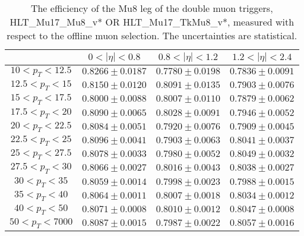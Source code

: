 \begin{table}[!ht]
\begin{center}
\begin{tabular}{c|c|c|c}
\hline & $0 < |\eta| < 0.8$ & $0.8 < |\eta| < 1.2$ & $1.2 < |\eta| < 2.4$  \\
\hline
$ 10 < p_T < 12.5$ & $0.8266 \pm 0.0187$ & $0.7780 \pm 0.0198$ & $0.7836 \pm 0.0091$  \\
$12.5 < p_T <  15$ & $0.8150 \pm 0.0120$ & $0.8091 \pm 0.0135$ & $0.7903 \pm 0.0076$  \\
$ 15 < p_T < 17.5$ & $0.8000 \pm 0.0088$ & $0.8007 \pm 0.0110$ & $0.7879 \pm 0.0062$  \\
$17.5 < p_T <  20$ & $0.8090 \pm 0.0065$ & $0.8028 \pm 0.0091$ & $0.7946 \pm 0.0052$  \\
$ 20 < p_T < 22.5$ & $0.8084 \pm 0.0051$ & $0.7920 \pm 0.0076$ & $0.7909 \pm 0.0045$  \\
$22.5 < p_T <  25$ & $0.8096 \pm 0.0041$ & $0.7903 \pm 0.0063$ & $0.8041 \pm 0.0037$  \\
$ 25 < p_T < 27.5$ & $0.8078 \pm 0.0033$ & $0.7980 \pm 0.0052$ & $0.8049 \pm 0.0032$  \\
$27.5 < p_T <  30$ & $0.8066 \pm 0.0027$ & $0.8016 \pm 0.0043$ & $0.8038 \pm 0.0027$  \\
$ 30 < p_T <  35$ & $0.8059 \pm 0.0014$ & $0.7998 \pm 0.0023$ & $0.7988 \pm 0.0015$  \\
$ 35 < p_T <  40$ & $0.8064 \pm 0.0011$ & $0.8007 \pm 0.0018$ & $0.8034 \pm 0.0012$  \\
$ 40 < p_T <  50$ & $0.8071 \pm 0.0008$ & $0.8010 \pm 0.0012$ & $0.8047 \pm 0.0008$  \\
$ 50 < p_T < 7000$ & $0.8087 \pm 0.0015$ & $0.7987 \pm 0.0022$ & $0.8057 \pm 0.0016$  \\
\hline
\hline
\end{tabular}
\caption{The efficiency of the Mu8 leg of the double muon triggers,
HLT\_Mu17\_Mu8\_v* OR HLT\_Mu17\_TkMu8\_v*,
measured with respect to the offline muon selection. 
The uncertainties are statistical.}
\label{tab:eff_muon_trail_dbl}
\end{center}
\end{table}


